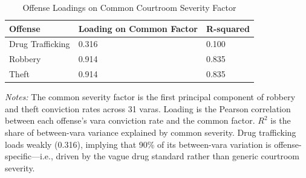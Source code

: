 \begin{table}[!h]
\centering
\caption{\label{tab:loadings}Offense Loadings on Common Courtroom Severity Factor}
\centering
\begin{tabular}[t]{lll}
\toprule
Offense & Loading on Common Factor & R-squared\\
\midrule
Drug Trafficking & 0.316 & 0.100\\
Robbery & 0.914 & 0.835\\
Theft & 0.914 & 0.835\\
\bottomrule
\end{tabular}
\end{table}
\begin{flushleft}\small
\textit{Notes:} The common severity factor is the first principal component of robbery and theft conviction rates across 31 varas. Loading is the Pearson correlation between each offense's vara conviction rate and the common factor. $R^2$ is the share of between-vara variance explained by common severity. Drug trafficking loads weakly (0.316), implying that 90\% of its between-vara variation is offense-specific---i.e., driven by the vague drug standard rather than generic courtroom severity.
\end{flushleft}
